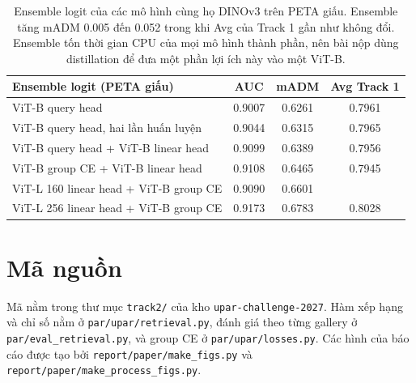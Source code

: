 \documentclass[11pt,a4paper]{article}
\begin{document}
\begin{table}[H]
\centering\small
\begin{tabular}{@{}lccc@{}}
\toprule
Ensemble logit (PETA giấu) & AUC & mADM & Avg Track 1 \\
\midrule
ViT-B query head & 0.9007 & 0.6261 & 0.7961 \\
ViT-B query head, hai lần huấn luyện & 0.9044 & 0.6315 & 0.7965 \\
ViT-B query head + ViT-B linear head & 0.9099 & 0.6389 & 0.7956 \\
ViT-B group CE + ViT-B linear head & 0.9108 & 0.6465 & 0.7945 \\
ViT-L 160 linear head + ViT-B group CE & 0.9090 & 0.6601 & \\
ViT-L 256 linear head + ViT-B group CE & 0.9173 & 0.6783 & 0.8028 \\
\bottomrule
\end{tabular}
\caption{Ensemble logit của các mô hình cùng họ DINOv3 trên PETA giấu. Ensemble tăng mADM 0.005 đến 0.052 trong khi Avg của Track 1 gần như không đổi. Ensemble tốn thời gian CPU của mọi mô hình thành phần, nên bài nộp dùng distillation để đưa một phần lợi ích này vào một ViT-B.}
\label{tab:ensb}
\end{table}

\section{Mã nguồn}

Mã nằm trong thư mục \texttt{track2/} của kho \texttt{upar-challenge-2027}. Hàm xếp hạng và chỉ số nằm ở \texttt{par/upar/retrieval.py}, đánh giá theo từng gallery ở \texttt{par/eval\_retrieval.py}, và group CE ở \texttt{par/upar/losses.py}. Các hình của báo cáo được tạo bởi \texttt{report/paper/make\_figs.py} và \texttt{report/paper/make\_process\_figs.py}.
\end{document}
